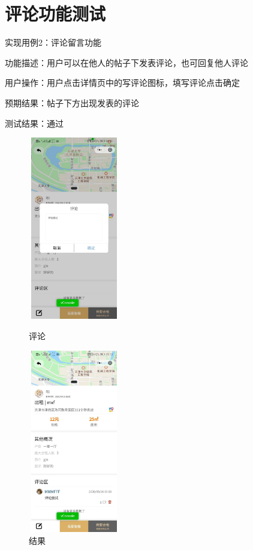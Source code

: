    \section{评论功能测试}

   实现用例2：评论留言功能

   功能描述：用户可以在他人的帖子下发表评论，也可回复他人评论
   
   用户操作：用户点击详情页中的写评论图标，填写评论点击确定
   
   预期结果：帖子下方出现发表的评论
   
   测试结果：通过
   
   \begin{figure}[htbp]
       \centering
       \begin{minipage}[t]{0.48\textwidth}
       \centering
       \includegraphics[width=4cm,height=8cm]{test/image/test38.png} 
    
      \caption{评论} 
       \end{minipage}
       \begin{minipage}[t]{0.48\textwidth}
        \centering
        \includegraphics[width=4cm,height=8cm]{test/image/test39.png} 
     
       \caption{结果} 
         \end{minipage}
       \end{figure}
 
